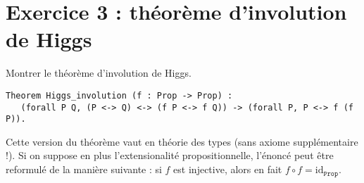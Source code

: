 \documentclass{article}
\begin{document}
\section*{Exercice 3 : théorème d'involution de Higgs}

Montrer le théorème d'involution de Higgs.
\begin{verbatim}
Theorem Higgs_involution (f : Prop -> Prop) :
   (forall P Q, (P <-> Q) <-> (f P <-> f Q)) -> (forall P, P <-> f (f P)).
\end{verbatim}

Cette version du théorème vaut en théorie des types (sans axiome supplémentaire !).
Si on suppose en plus l'extensionalité propositionnelle,
l'énoncé peut être reformulé de la manière suivante : si \(f\) est injective, alors en fait \(f \circ f = \mathrm{id}_{\texttt{Prop}}\).
\end{document}
